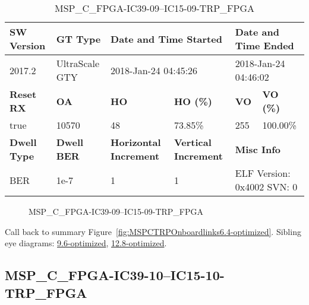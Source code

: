 \begin{table}[h]
\centering
\caption{MSP\_C\_FPGA-IC39-09--IC15-09-TRP\_FPGA}
\label{tab:MSPCFPGAIC3909IC1509TRPFPGA6.4-optimized}
\begin{tabular}{@{}|l|l|l|l|l|l|@{}}
\toprule
\textbf{SW Version}                & \textbf{GT Type}   & \multicolumn{2}{l|}{\textbf{Date and Time Started}}            & \multicolumn{2}{l|}{\textbf{Date and Time Ended}}        \\ \midrule
2017.2                       & UltraScale GTY          & \multicolumn{2}{l|}{2018-Jan-24 04:45:26}                   & \multicolumn{2}{l|}{2018-Jan-24 04:46:02}               \\ \midrule
\textbf{Reset RX}                  & \textbf{OA} & \textbf{HO}   & \textbf{HO (\%)} & \textbf{VO} & \textbf{VO (\%)} \\ \midrule
true & 10570        & 48          & 73.85\%        & 255        & 100.00\%       \\ \midrule
\textbf{Dwell Type}                & \textbf{Dwell BER} & \textbf{Horizontal Increment} & \textbf{Vertical Increment}    & \multicolumn{2}{l|}{\textbf{Misc Info}}                  \\ \midrule
BER                            & 1e-7        & 1        & 1           & \multicolumn{2}{l|}{ELF Version: 0x4002 SVN: 0}                         \\ \bottomrule
\end{tabular}
\end{table}

\begin{figure}[h]
\caption{MSP\_C\_FPGA-IC39-09--IC15-09-TRP\_FPGA} \label{fig:MSPCFPGAIC3909IC1509TRPFPGA6.4-optimized}
\end{figure}

Call back to summary Figure~\ref{fig:MSPCTRPOnboardlinks6.4-optimized}.
Sibling eye diagrams: \hyperref[sec:MSPCFPGAIC3909IC1509TRPFPGA9.6-optimized]{9.6-optimized}, \hyperref[sec:MSPCFPGAIC3909IC1509TRPFPGA12.8-optimized]{12.8-optimized}.

\clearpage
\newpage


\subsection{MSP\_C\_FPGA-IC39-10--IC15-10-TRP\_FPGA}\label{sec:MSPCFPGAIC3910IC1510TRPFPGA6.4-optimized}


